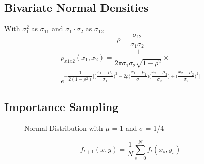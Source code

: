 \documentclass[11pt,twoside,a4paper,fleqn]{report}
\numberwithin{equation}{chapter}
\numberwithin{figure}{chapter}
\numberwithin{table}{chapter}
\begin{document}
\subsection{Bivariate Normal Densities}
With $\sigma_1^2$ as $\sigma_{11}$ and $\sigma_1 \cdot\sigma_2$ as $\sigma_{12}$
\begin{equation}
	\rho = \dfrac{\sigma_{12}}{\sigma_1\sigma_2}
\end{equation}
\begin{equation}
	\begin{multlined}
		p_{x1x2}(x_1,x_2)=\dfrac{1}{2\pi\sigma_1\sigma_2\sqrt{1-\rho^2}} \times \\ e^{-\dfrac{1}{2(1-\rho^2)}\bigg[\bigg(\dfrac{x_1-\mu_1}{\sigma_1}\bigg)^2-2\rho\bigg(\dfrac{x_1-\mu_1}{\sigma_1}\bigg)\bigg(\dfrac{x_2-\mu_2}{\sigma_2}\bigg)+\bigg(\dfrac{x_2-\mu_2}{\sigma_2}\bigg)^2\bigg]}
	\end{multlined}
\end{equation}


\subsection{Importance Sampling}
	\begin{figure}[H]
	\centering
	\caption{Normal Distribution with $\mu$ = 1 and $\sigma$ = 1/4}
	\label{fig:importancesampling}
\end{figure}


\begin{equation}
	f_{t+1}(x,y) = \frac{1}{N}\sum_{s=0}^{N} f_{t}(x_s,y_s)
\end{equation}
\end{document}
